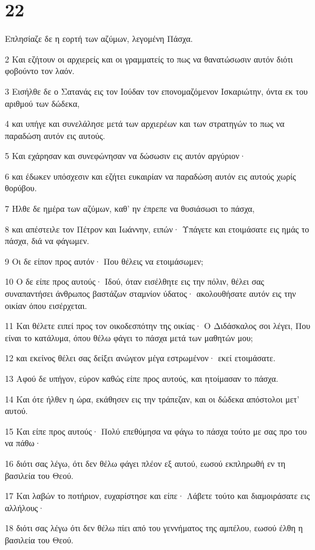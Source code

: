 \chapter{22}

\par Επλησίαζε δε η εορτή των αζύμων, λεγομένη Πάσχα.
\par 2 Και εζήτουν οι αρχιερείς και οι γραμματείς το πως να θανατώσωσιν αυτόν διότι φοβούντο τον λαόν.
\par 3 Εισήλθε δε ο Σατανάς εις τον Ιούδαν τον επονομαζόμενον Ισκαριώτην, όντα εκ του αριθμού των δώδεκα,
\par 4 και υπήγε και συνελάλησε μετά των αρχιερέων και των στρατηγών το πως να παραδώση αυτόν εις αυτούς.
\par 5 Και εχάρησαν και συνεφώνησαν να δώσωσιν εις αυτόν αργύριον·
\par 6 και έδωκεν υπόσχεσιν και εζήτει ευκαιρίαν να παραδώση αυτόν εις αυτούς χωρίς θορύβου.
\par 7 Ήλθε δε ημέρα των αζύμων, καθ' ην έπρεπε να θυσιάσωσι το πάσχα,
\par 8 και απέστειλε τον Πέτρον και Ιωάννην, ειπών· Υπάγετε και ετοιμάσατε εις ημάς το πάσχα, διά να φάγωμεν.
\par 9 Οι δε είπον προς αυτόν· Που θέλεις να ετοιμάσωμεν;
\par 10 Ο δε είπε προς αυτούς· Ιδού, όταν εισέλθητε εις την πόλιν, θέλει σας συναπαντήσει άνθρωπος βαστάζων σταμνίον ύδατος· ακολουθήσατε αυτόν εις την οικίαν όπου εισέρχεται.
\par 11 Και θέλετε ειπεί προς τον οικοδεσπότην της οικίας· Ο Διδάσκαλος σοι λέγει, Που είναι το κατάλυμα, όπου θέλω φάγει το πάσχα μετά των μαθητών μου;
\par 12 και εκείνος θέλει σας δείξει ανώγεον μέγα εστρωμένον· εκεί ετοιμάσατε.
\par 13 Αφού δε υπήγον, εύρον καθώς είπε προς αυτούς, και ητοίμασαν το πάσχα.
\par 14 Και ότε ήλθεν η ώρα, εκάθησεν εις την τράπεζαν, και οι δώδεκα απόστολοι μετ' αυτού.
\par 15 Και είπε προς αυτούς· Πολύ επεθύμησα να φάγω το πάσχα τούτο με σας προ του να πάθω·
\par 16 διότι σας λέγω, ότι δεν θέλω φάγει πλέον εξ αυτού, εωσού εκπληρωθή εν τη βασιλεία του Θεού.
\par 17 Και λαβών το ποτήριον, ευχαρίστησε και είπε· Λάβετε τούτο και διαμοιράσατε εις αλλήλους·
\par 18 διότι σας λέγω ότι δεν θέλω πίει από του γεννήματος της αμπέλου, εωσού έλθη η βασιλεία του Θεού.
